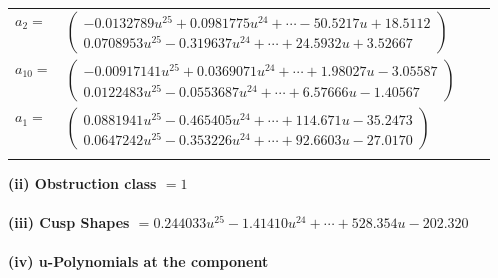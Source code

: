 \documentclass[1p]{elsarticle_modified}
\theoremstyle{definition}
\begin{document}
\begin{tabular}{m{7pt} m{180pt} m{7pt} m{180pt} }
\flushright $a_{2}=$&$\begin{pmatrix}-0.0132789 u^{25}+0.0981775 u^{24}+\cdots-50.5217 u+18.5112\\0.0708953 u^{25}-0.319637 u^{24}+\cdots+24.5932 u+3.52667\end{pmatrix}$ \\
\flushright $a_{10}=$&$\begin{pmatrix}-0.00917141 u^{25}+0.0369071 u^{24}+\cdots+1.98027 u-3.05587\\0.0122483 u^{25}-0.0553687 u^{24}+\cdots+6.57666 u-1.40567\end{pmatrix}$ \\
\flushright $a_{1}=$&$\begin{pmatrix}0.0881941 u^{25}-0.465405 u^{24}+\cdots+114.671 u-35.2473\\0.0647242 u^{25}-0.353226 u^{24}+\cdots+92.6603 u-27.0170\end{pmatrix}$\\&\end{tabular}
\flushleft \textbf{(ii) Obstruction class $= 1$}\\~\\
\flushleft \textbf{(iii) Cusp Shapes $= 0.244033 u^{25}-1.41410 u^{24}+\cdots+528.354 u-202.320$}\\~\\
\newpage\renewcommand{\arraystretch}{1}
\flushleft \textbf{(iv) u-Polynomials at the component}\newline \\
\end{document}
